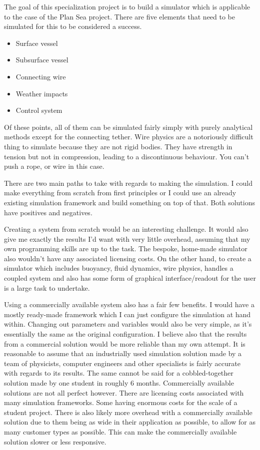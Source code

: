 \label{sec:sim_options}
The goal of this specialization project is to build a simulator which is applicable to the case of the Plan Sea project. There are five elements that need to be simulated for this to be considered a success. 
\begin{itemize}
\item Surface vessel
\item Subsurface vessel
\item Connecting wire
\item Weather impacts
\item Control system
\end{itemize}

Of these points, all of them can be simulated fairly simply with purely  analytical methods except for the connecting tether. Wire physics are a notoriously difficult thing to simulate because they are not rigid bodies. They have strength in tension but not in compression, leading to a discontinuous behaviour. You can't push a rope, or wire in this case. 

There are two main paths to take with regards to making the simulation. I could make everything from scratch from first principles or I could use an already existing simulation framework and build something on top of that. Both solutions have positives and negatives. 

Creating a system from scratch would be an interesting challenge. It would also give me exactly the results I'd want with very little overhead, assuming that my own programming skills are up to the task. The bespoke, home-made simulator also wouldn't have any associated licensing costs. On the other hand, to create a simulator which includes buoyancy, fluid dynamics, wire physics, handles a coupled system and also has some form of graphical interface/readout for the user is a large task to undertake. 

Using a commercially available system also has a fair few benefits. I would have a mostly ready-made framework which I can just configure the simulation at hand within. Changing out parameters and variables would also be very simple, as it's essentially the same as the original configuration. I believe also that the results from a commercial solution would be more reliable than my own attempt. It is reasonable to assume that an industrially used simulation solution made by a team of physicists, computer engineers and other specialists is fairly accurate with regards to its results. The same cannot be said for a cobbled-together solution made by one student in roughly 6 months. Commercially available solutions are not all perfect however. There are licensing costs associated with many simulation frameworks. Some having enormous costs for the scale of a student project. There is also likely more overhead with a commercially available solution due to them being as wide in their application as possible, to allow for as many customer types as possible. This can make the commercially available solution slower or less responsive. 

